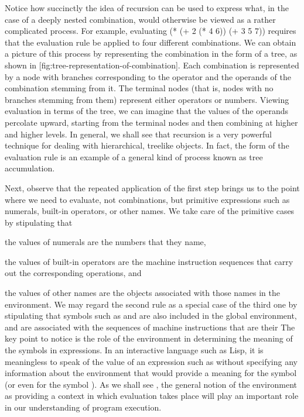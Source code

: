 Notice how succinctly the idea of recursion can be used to express what,
in the case of a deeply nested combination,
would otherwise be viewed as a rather complicated process.
For example, evaluating
\startcode
(* (+ 2 (* 4 6))
   (+ 3 5 7))
\stopcode
requires that the evaluation rule be applied to four different combinations.
We can obtain a picture of this process by representing the combination in the form of a tree,
as shown in [fig:tree-representation-of-combination].
Each combination is represented by a node
with branches corresponding to the operator and the operands of the combination stemming from it.
The terminal nodes
(that is, nodes with no branches stemming from them)
represent either operators or numbers.
Viewing evaluation in terms of the tree,
we can imagine that the values of the operands percolate upward,
starting from the terminal nodes and then combining at higher and higher levels.
In general,
we shall see that recursion is a very powerful technique for dealing with hierarchical, treelike objects.
In fact, the  form of the evaluation rule is
an example of a general kind of process known as tree accumulation.

            {}

Next, observe that the repeated application of the first step brings us to the point where we need to evaluate,
not combinations,
but primitive expressions such as numerals, built-in operators, or other names.
We take care of the primitive cases by stipulating that
\startitemize[1]
\item the values of numerals are the numbers that they name,
\item the values of built-in operators are the machine instruction sequences
      that carry out the corresponding operations, and
\item the values of other names are the objects associated with those names in the environment.
\stopitemize
We may regard the second rule as a special case of the third one by stipulating that
symbols such as \exp{+} and \exp{*} are also included in the global environment,
and are associated with the sequences of machine instructions that are their 
The key point to notice is
the role of the environment in determining the meaning of the symbols in expressions.
In an interactive language such as Lisp,
it is meaningless to speak of
the value of an expression such as  without specifying any information about the environment
that would provide a meaning for the symbol  (or even for the symbol \exp{+}).
As we shall see ,
the general notion of the environment
as providing a context in which evaluation takes place
will play an important role in our understanding of program execution.

